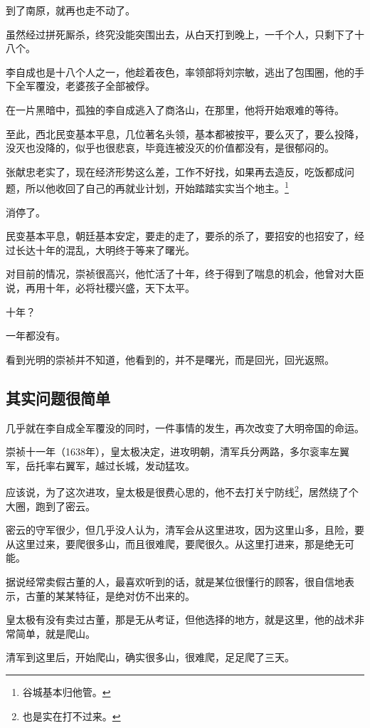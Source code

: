 \begin{multicols}{\theparacolNo}
		到了南原，就再也走不动了。

		虽然经过拼死厮杀，终究没能突围出去，从白天打到晚上，一千个人，只剩下了十八个。

		李自成也是十八个人之一，他趁着夜色，率领部将刘宗敏，逃出了包围圈，他的手下全军覆没，老婆孩子全部被俘。

		在一片黑暗中，孤独的李自成逃入了商洛山，在那里，他将开始艰难的等待。

		至此，西北民变基本平息，几位著名头领，基本都被按平，要么灭了，要么投降，没灭也没降的，似乎也很悲哀，毕竟连被没灭的价值都没有，是很郁闷的。

		张献忠老实了，现在经济形势这么差，工作不好找，如果再去造反，吃饭都成问题，所以他收回了自己的再就业计划，开始踏踏实实当个地主。\footnote{谷城基本归他管。}

		消停了。

		民变基本平息，朝廷基本安定，要走的走了，要杀的杀了，要招安的也招安了，经过长达十年的混乱，大明终于等来了曙光。

		对目前的情况，崇祯很高兴，他忙活了十年，终于得到了喘息的机会，他曾对大臣说，再用十年，必将社稷兴盛，天下太平。

		十年？

		一年都没有。

		看到光明的崇祯并不知道，他看到的，并不是曙光，而是回光，回光返照。

		\subsection{其实问题很简单}
		几乎就在李自成全军覆没的同时，一件事情的发生，再次改变了大明帝国的命运。

		崇祯十一年（1638年），皇太极决定，进攻明朝，清军兵分两路，多尔衮率左翼军，岳托率右翼军，越过长城，发动猛攻。

		应该说，为了这次进攻，皇太极是很费心思的，他不去打关宁防线\footnote{也是实在打不过来。}，居然绕了个大圈，跑到了密云。

		密云的守军很少，但几乎没人认为，清军会从这里进攻，因为这里山多，且险，要从这里过来，要爬很多山，而且很难爬，要爬很久。从这里打进来，那是绝无可能。

		据说经常卖假古董的人，最喜欢听到的话，就是某位很懂行的顾客，很自信地表示，古董的某某特征，是绝对仿不出来的。

		皇太极有没有卖过古董，那是无从考证，但他选择的地方，就是这里，他的战术非常简单，就是爬山。

		清军到这里后，开始爬山，确实很多山，很难爬，足足爬了三天。


\end{multicols}
